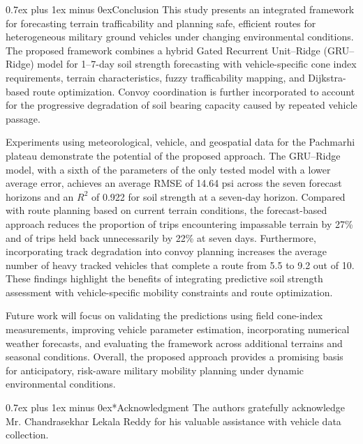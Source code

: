 \documentclass[conference]{IEEEtran}
\makeatletter
\def\section{\needspace{7\baselineskip}\@startsection{section}{1}{\z@}{2.5ex plus 1ex minus 0.5ex}%
{0.7ex plus 1ex minus 0ex}{\normalfont\normalsize\centering\scshape}}
\makeatother
\begin{document}

\section{Conclusion}
This study presents an integrated framework for forecasting terrain trafficability and planning safe, efficient routes for heterogeneous military ground vehicles under changing environmental conditions. The proposed framework combines a hybrid Gated Recurrent Unit–Ridge (GRU–Ridge) model for 1–7-day soil strength forecasting with vehicle-specific cone index requirements, terrain characteristics, fuzzy trafficability mapping, and Dijkstra-based route optimization. Convoy coordination is further incorporated to account for the progressive degradation of soil bearing capacity caused by repeated vehicle passage.

Experiments using meteorological, vehicle, and geospatial data for the Pachmarhi plateau demonstrate the potential of the proposed approach. The GRU–Ridge model, with a sixth of the parameters of the only tested model with a lower average error, achieves an average RMSE of 14.64 psi across the seven forecast horizons and an \(R^2\) of 0.922 for soil strength at a seven-day horizon. Compared with route planning based on current terrain conditions, the forecast-based approach reduces the proportion of trips encountering impassable terrain by 27\% and of trips held back unnecessarily by 22\% at seven days. Furthermore, incorporating track degradation into convoy planning increases the average number of heavy tracked vehicles that complete a route from 5.5 to 9.2 out of 10. These findings highlight the benefits of integrating predictive soil strength assessment with vehicle-specific mobility constraints and route optimization.

Future work will focus on validating the predictions using field cone-index measurements, improving vehicle parameter estimation, incorporating numerical weather forecasts, and evaluating the framework across additional terrains and seasonal conditions. Overall, the proposed approach provides a promising basis for anticipatory, risk-aware military mobility planning under dynamic environmental conditions.

\section*{Acknowledgment}
The authors gratefully acknowledge Mr. Chandrasekhar Lekala Reddy for his valuable assistance with vehicle data collection.
\end{document}
